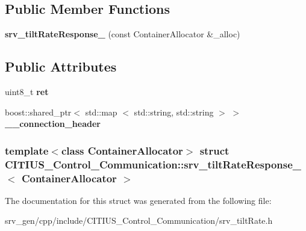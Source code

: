 \subsection*{\-Public \-Member \-Functions}
\begin{DoxyCompactItemize}
\item 
\hypertarget{struct_c_i_t_i_u_s___control___communication_1_1srv__tilt_rate_response___a9a3cd526e8c047fe36f65b23590c2772}{{\bfseries srv\-\_\-tilt\-Rate\-Response\-\_\-} (const \-Container\-Allocator \&\-\_\-alloc)}\label{struct_c_i_t_i_u_s___control___communication_1_1srv__tilt_rate_response___a9a3cd526e8c047fe36f65b23590c2772}

\end{DoxyCompactItemize}
\subsection*{\-Public \-Attributes}
\begin{DoxyCompactItemize}
\item 
\hypertarget{struct_c_i_t_i_u_s___control___communication_1_1srv__tilt_rate_response___a904f71ceddc2b74002566cd851ba088b}{uint8\-\_\-t {\bfseries ret}}\label{struct_c_i_t_i_u_s___control___communication_1_1srv__tilt_rate_response___a904f71ceddc2b74002566cd851ba088b}

\item 
\hypertarget{struct_c_i_t_i_u_s___control___communication_1_1srv__tilt_rate_response___a510d29738f0c89d8eb2136bb72637ea4}{boost\-::shared\-\_\-ptr$<$ std\-::map\*
$<$ std\-::string, std\-::string $>$ $>$ {\bfseries \-\_\-\-\_\-connection\-\_\-header}}\label{struct_c_i_t_i_u_s___control___communication_1_1srv__tilt_rate_response___a510d29738f0c89d8eb2136bb72637ea4}

\end{DoxyCompactItemize}
\subsubsection*{template$<$class Container\-Allocator$>$ struct C\-I\-T\-I\-U\-S\-\_\-\-Control\-\_\-\-Communication\-::srv\-\_\-tilt\-Rate\-Response\-\_\-$<$ Container\-Allocator $>$}



\-The documentation for this struct was generated from the following file\-:\begin{DoxyCompactItemize}
\item 
srv\-\_\-gen/cpp/include/\-C\-I\-T\-I\-U\-S\-\_\-\-Control\-\_\-\-Communication/srv\-\_\-tilt\-Rate.\-h\end{DoxyCompactItemize}
